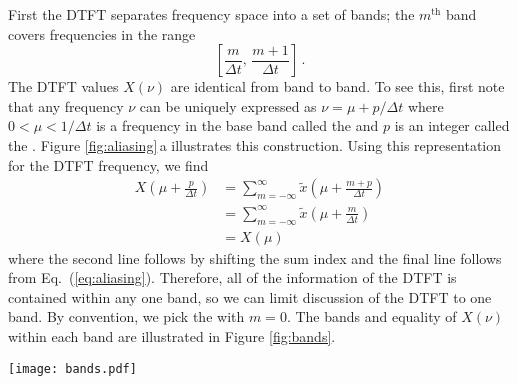 First the DTFT separates frequency space into a set of bands; the $m^\text{th}$ band covers frequencies in the range
\begin{equation}
\left[ \frac{m}{\Delta t}, \, \frac{m+1}{\Delta t} \right] \, . \nonumber
\end{equation}
The DTFT values $X(\nu)$ are identical from band to band.
To see this, first note that any frequency $\nu$ can be uniquely expressed as $\nu = \mu + p / \Delta t$ where \mbox{$0 < \mu < 1/\Delta t$} is a frequency in the base band called the  and $p$ is an integer called the .
Figure \ref{fig:aliasing}\,a illustrates this construction.
Using this representation for the DTFT frequency, we find
\begin{align}
  X \left(\mu + \frac{p}{\Delta t} \right) \nonumber
  &= \sum_{m=-\infty}^\infty \tilde{x}	\left(\mu + \frac{m + p}{\Delta t} \right) \nonumber \\
  &= \sum_{m=-\infty}^\infty \tilde{x}	\left(\mu + \frac{m}{\Delta t} \right) \nonumber \\
  &= X(\mu)
\end{align}
where the second line follows by shifting the sum index and the final line follows from Eq.~(\ref{eq:aliasing}).
Therefore, all of the information of the DTFT is contained within any one band, so we can limit discussion of the DTFT to one band.
By convention, we pick the  with $m=0$.
The bands and equality of $X(\nu)$ within each band are illustrated in Figure \ref{fig:bands}.


\begin{figure*}[t]
\begin{centering}
\texttt{[image: bands.pdf]}
\par\end{centering}
\caption{The DTFT produces bands of with $1/\Delta t$. For \emph{any} $x_n$, the values of $X(\nu)$ within each band are identical.}
\label{fig:bands}
\end{figure*}

